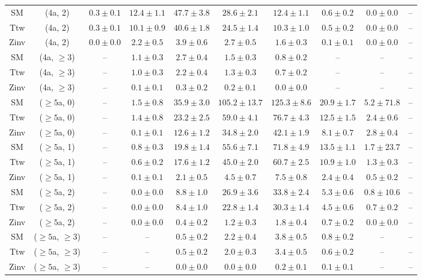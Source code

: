 \begin{table}[h!]
{\begin{tabular}{cccccccccc}
	SM & (4a, 2) & $0.3\pm 0.1$ & $12.4\pm 1.1$ & $47.7\pm 3.8$ & $28.6\pm 2.1$ & $12.4\pm 1.1$ & $0.6\pm 0.2$ & $0.0\pm 0.0$ & -- \\[0.5ex] 
	Ttw & (4a, 2) & $0.3\pm 0.1$ & $10.1\pm 0.9$ & $40.6\pm 1.8$ & $24.5\pm 1.4$ & $10.3\pm 1.0$ & $0.5\pm 0.2$ & $0.0\pm 0.0$ & -- \\[0.5ex] 
	Zinv & (4a, 2) & $0.0\pm 0.0$ & $2.2\pm 0.5$ & $3.9\pm 0.6$ & $2.7\pm 0.5$ & $1.6\pm 0.3$ & $0.1\pm 0.1$ & $0.0\pm 0.0$ & -- \\[0.5ex] 
	SM & (4a, $\ge3$) & -- & $1.1\pm 0.3$ & $2.7\pm 0.4$ & $1.5\pm 0.3$ & $0.8\pm 0.2$ & -- & -- & -- \\[0.5ex] 
	Ttw & (4a, $\ge3$) & -- & $1.0\pm 0.3$ & $2.2\pm 0.4$ & $1.3\pm 0.3$ & $0.7\pm 0.2$ & -- & -- & -- \\[0.5ex] 
	Zinv & (4a, $\ge3$) & -- & $0.1\pm 0.1$ & $0.3\pm 0.2$ & $0.2\pm 0.1$ & $0.0\pm 0.0$ & -- & -- & -- \\[0.5ex] 
	SM & ($\ge5$a, 0) & -- & $1.5\pm 0.8$ & $35.9\pm 3.0$ & $105.2\pm 13.7$ & $125.3\pm 8.6$ & $20.9\pm 1.7$ & $5.2\pm 71.8$ & -- \\[0.5ex] 
	Ttw & ($\ge5$a, 0) & -- & $1.4\pm 0.8$ & $23.2\pm 2.5$ & $59.0\pm 4.1$ & $76.7\pm 4.3$ & $12.5\pm 1.5$ & $2.4\pm 0.6$ & -- \\[0.5ex] 
	Zinv & ($\ge5$a, 0) & -- & $0.1\pm 0.1$ & $12.6\pm 1.2$ & $34.8\pm 2.0$ & $42.1\pm 1.9$ & $8.1\pm 0.7$ & $2.8\pm 0.4$ & -- \\[0.5ex] 
	SM & ($\ge5$a, 1) & -- & $0.8\pm 0.3$ & $19.8\pm 1.4$ & $55.6\pm 7.1$ & $71.8\pm 4.9$ & $13.5\pm 1.1$ & $1.7\pm 23.7$ & -- \\[0.5ex] 
	Ttw & ($\ge5$a, 1) & -- & $0.6\pm 0.2$ & $17.6\pm 1.2$ & $45.0\pm 2.0$ & $60.7\pm 2.5$ & $10.9\pm 1.0$ & $1.3\pm 0.3$ & -- \\[0.5ex] 
	Zinv & ($\ge5$a, 1) & -- & $0.1\pm 0.1$ & $2.1\pm 0.5$ & $4.5\pm 0.7$ & $7.5\pm 0.8$ & $2.4\pm 0.4$ & $0.5\pm 0.2$ & -- \\[0.5ex] 
	SM & ($\ge5$a, 2) & -- & $0.0\pm 0.0$ & $8.8\pm 1.0$ & $26.9\pm 3.6$ & $33.8\pm 2.4$ & $5.3\pm 0.6$ & $0.8\pm 10.6$ & -- \\[0.5ex] 
	Ttw & ($\ge5$a, 2) & -- & $0.0\pm 0.0$ & $8.4\pm 1.0$ & $22.8\pm 1.4$ & $30.3\pm 1.4$ & $4.5\pm 0.6$ & $0.7\pm 0.2$ & -- \\[0.5ex] 
	Zinv & ($\ge5$a, 2) & -- & $0.0\pm 0.0$ & $0.4\pm 0.2$ & $1.2\pm 0.3$ & $1.8\pm 0.4$ & $0.7\pm 0.2$ & $0.0\pm 0.0$ & -- \\[0.5ex] 
	SM & ($\ge5$a, $\ge3$) & -- & -- & $0.5\pm 0.2$ & $2.2\pm 0.4$ & $3.8\pm 0.5$ & $0.8\pm 0.2$ & -- & -- \\[0.5ex] 
	Ttw & ($\ge5$a, $\ge3$) & -- & -- & $0.5\pm 0.2$ & $2.0\pm 0.3$ & $3.4\pm 0.5$ & $0.6\pm 0.2$ & -- & -- \\[0.5ex] 
	Zinv & ($\ge5$a, $\ge3$) & -- & -- & $0.0\pm 0.0$ & $0.0\pm 0.0$ & $0.2\pm 0.1$ & $0.1\pm 0.1$ & -- & -- \\[0.5ex] 
	\hline
	\hline
\end{tabular}}
\end{table}
